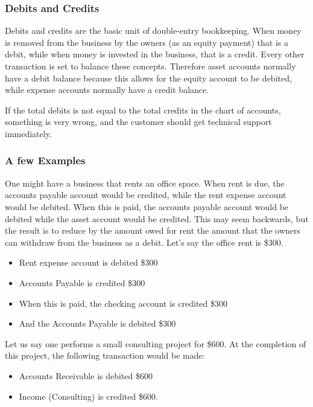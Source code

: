 \documentclass{article}
\begin{document}
\subsubsection{Debits and Credits}

Debits and credits are the basic unit of double-entry bookkeeping.  When money
is removed from the business by the owners (as an equity payment) that is a
debit, while when money is invested in the business, that is a credit.  Every
other transaction is set to balance these concepts.  Therefore asset accounts
normally have a debit balance because this allows for the equity account to be
debited, while expense accounts normally have a credit balance.

If the total debits is not equal to the total credits in the chart of accounts,
something is very wrong, and the customer should get technical support
immediately.

\subsubsection{A few Examples}

One might have a business that rents an office space.  When
rent is due, the accounts payable account would be credited, while the rent
expense account would be debited.  When this is paid, the accounts payable
account would be debited while the asset account would be credited.  This may
seem backwards, but the result is to reduce by the amount owed for rent the
amount that the owners can withdraw from the business as a debit. Let's say the
office rent is \$300.

\begin{itemize}
\item Rent expense account is debited \$300
\item Accounts Payable is credited \$300
\item When this is paid, the checking account is credited \$300
\item And the Accounts Payable is debited \$300
\end{itemize}

Let us say one performs a small consulting project for \$600.  At the completion
of this project, the following transaction would be made:

\begin{itemize}
\item Accounts Receivable is debited \$600
\item Income (Consulting) is credited \$600.
\end{itemize}
\end{document}

